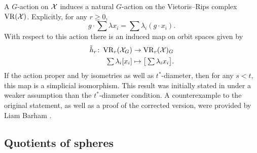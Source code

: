 A \(G\)-action on $\mathcal{X}$ induces a natural \(G\)-action on the Vietoris--Rips complex $\operatorname{VR}(\mathcal{X})$.
Explicitly, for any \(r \geq 0\),
\[
g \cdot \sum \lambda x_i = \sum \lambda_i (g\cdot x_i).
\]
With respect to this action there is an induced map on orbit spaces given by
\begin{align*}
	\tilde h_r \colon \operatorname{VR}_r(\mathcal{X}_G) &\to \operatorname{VR}_r(\mathcal{X})_G \\
	\textstyle\sum\lambda_i [x_i] &\mapsto \textstyle \big[\sum\lambda_i x_i\big].
\end{align*}
If the action proper and by isometries as well as \(t^*\)-diameter, then for any \(s < t\), this map is a simplicial isomorphism.
This result was initially stated in \cite[Prop.~3.5]{adams2022metric} under a weaker assumption than the \(t^*\)-diameter condition.
A counterexample to the original statement, as well as a proof of the corrected version, were provided by Liam Barham \cite{bibid}.




%

\subsection{Quotients of spheres}

